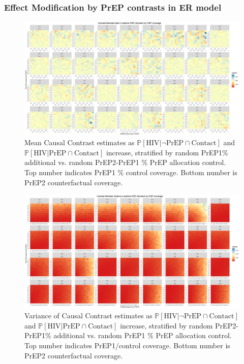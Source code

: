 \documentclass{article}
\theoremstyle{definition}
\begin{document}
\subsubsection{Effect Modification by PrEP contrasts in ER model}
\begin{figure}[H]
    \centering
    \includegraphics[width=\linewidth]{Figures/PrEP Additive Mean Plots.png}
    \caption{Mean Causal Contrast estimates as $\mathbb{P}\left[\text{HIV} \vert \neg \text{PrEP} \cap \text{Contact}\right]$ and $\mathbb{P}\left[\text{HIV} \vert \text{PrEP} \cap \text{Contact}\right]$ increase, stratified by random PrEP1\% additional vs. random PrEP2-PrEP1 \% PrEP allocation control. Top number indicates PrEP1 \% control coverage. Bottom number is PrEP2 counterfactual coverage. }
    \label{fig:Figure S4.11}
\end{figure}
\begin{figure}[H]
    \centering
    \includegraphics[width=\linewidth]{Figures/PrEP Additive Variance Plots.png}
    \caption{Variance of Causal Contrast estimates as $\mathbb{P}\left[\text{HIV} \vert \neg \text{PrEP} \cap \text{Contact}\right]$ and $\mathbb{P}\left[\text{HIV} \vert \text{PrEP} \cap \text{Contact}\right]$ increase, stratified by random PrEP2-PrEP1\% additional vs. random PrEP1 \% PrEP allocation control. Top number indicates PrEP1/control coverage. Bottom number is PrEP2 counterfactual coverage.}
    \label{fig:Figure S4.12}
\end{figure}
\end{document}
